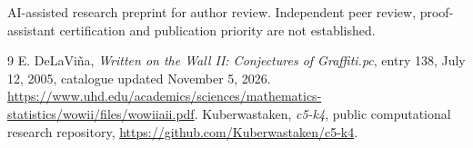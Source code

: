 \documentclass[11pt,a4paper]{article}
\begin{document}
AI-assisted research preprint for author review. Independent peer review, proof-assistant certification and publication priority are not established.
\begin{thebibliography}{9}
 E. DeLaVi\~na, \emph{Written on the Wall II: Conjectures of Graffiti.pc}, entry 138, July 12, 2005, catalogue updated November 5, 2026. \url{https://www.uhd.edu/academics/sciences/mathematics-statistics/wowii/files/wowiiaii.pdf}.
 Kuberwastaken, \emph{c5-k4}, public computational research repository, \url{https://github.com/Kuberwastaken/c5-k4}.
\end{thebibliography}
\end{document}
